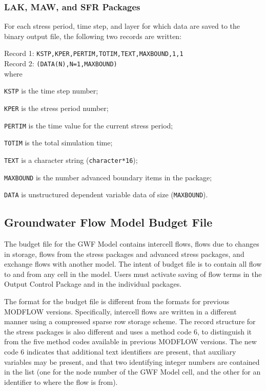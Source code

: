 \newpage
\subsubsection{LAK, MAW, and SFR Packages}

\vspace{5mm}
For each stress period, time step, and layer for which data are saved to the binary output file, the following two records are written:

\vspace{5mm}
\noindent Record 1: \texttt{KSTP,KPER,PERTIM,TOTIM,TEXT,MAXBOUND,1,1} \\
\noindent Record 2: \texttt{(DATA(N),N=1,MAXBOUND)} \\

\vspace{5mm}
\noindent where

\begin{description} \itemsep0pt \parskip0pt 
\item \texttt{KSTP} is the time step number;
\item \texttt{KPER} is the stress period number;
\item \texttt{PERTIM} is the time value for the current stress period; 
\item \texttt{TOTIM} is the total simulation time;
\item \texttt{TEXT} is a character string (\texttt{character*16});
\item \texttt{MAXBOUND} is the number advanced boundary items in the package;
\item \texttt{DATA} is unstructured dependent variable data of size (\texttt{MAXBOUND}).
\end{description}


\newpage
\subsection{Groundwater Flow Model Budget File}
The budget file for the GWF Model contains intercell flows, flows due to changes in storage, flows from the stress packages and advanced stress packages, and exchange flows with another model.  The intent of budget file is to contain all flow to and from any cell in the model.  Users must activate saving of flow terms in the Output Control Package and in the individual packages.  

The format for the budget file is different from the formats for previous MODFLOW versions.  Specifically, intercell flows are written in a different manner using a compressed sparse row storage scheme.  The record structure for the stress packages is also different and uses a method code 6, to distinguish it from the five method codes available in previous MODFLOW versions.  The new code 6 indicates that additional text identifiers are present, that auxiliary variables may be present, and that two identifying integer numbers are contained in the list (one for the node number of the GWF Model cell, and the other for an identifier to where the flow is from).  

